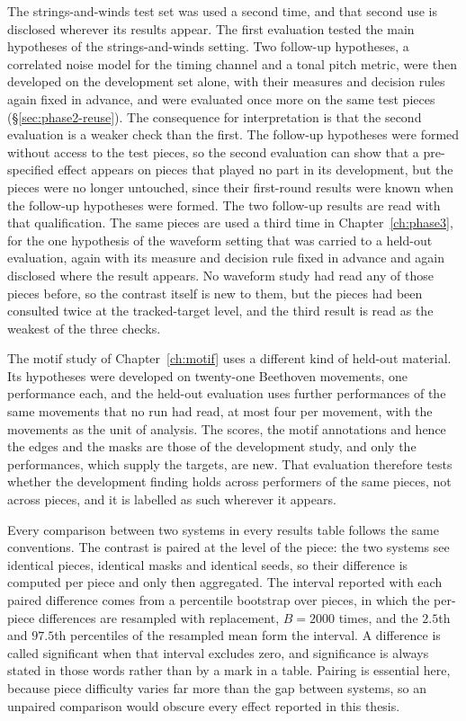 The strings-and-winds test set was used a second time, and that second use is
disclosed wherever its results appear. The first evaluation tested the main
hypotheses of the strings-and-winds setting. Two follow-up hypotheses, a
correlated noise model for the timing channel and a tonal pitch metric, were
then developed on the development set alone, with their measures and decision
rules again fixed in advance, and were evaluated once more on the same test
pieces (\S\ref{sec:phase2-reuse}). The consequence for interpretation is that
the second evaluation is a weaker check than the first. The follow-up
hypotheses were formed without access to the test pieces, so the second
evaluation can show that a pre-specified effect appears on pieces that played
no part in its development, but the pieces were no longer untouched, since
their first-round results were known when the follow-up hypotheses were
formed. The two follow-up results are read with that qualification. The
same pieces are used a third time in Chapter~\ref{ch:phase3}, for the one
hypothesis of the waveform setting that was carried to a held-out
evaluation, again with its measure and decision rule fixed in advance and
again disclosed where the result appears. No waveform study had read any of
those pieces before, so the contrast itself is new to them, but the pieces
had been consulted twice at the tracked-target level, and the third result
is read as the weakest of the three checks.

The motif study of Chapter~\ref{ch:motif} uses a different kind of held-out
material. Its hypotheses were developed on twenty-one Beethoven movements,
one performance each, and the held-out evaluation uses further performances
of the same movements that no run had read, at most four per movement, with
the movements as the unit of analysis. The scores, the motif annotations and
hence the edges and the masks are those of the development study, and only
the performances, which supply the targets, are new. That evaluation
therefore tests whether the development finding holds across performers of
the same pieces, not across pieces, and it is labelled as such wherever it
appears.

Every comparison between two systems in every results table follows the same
conventions. The contrast is paired at the level of the piece: the two
systems see identical pieces, identical masks and identical seeds, so their
difference is computed per piece and only then aggregated. The interval
reported with each paired difference comes from a percentile bootstrap over
pieces, in which the per-piece differences are resampled with replacement,
$B = 2000$ times, and the $2.5$th and $97.5$th percentiles of the resampled
mean form the interval. A difference is called significant when that interval
excludes zero, and significance is always stated in those words rather than
by a mark in a table. Pairing is essential here, because piece difficulty
varies far more than the gap between systems, so an unpaired comparison would
obscure every effect reported in this thesis.


